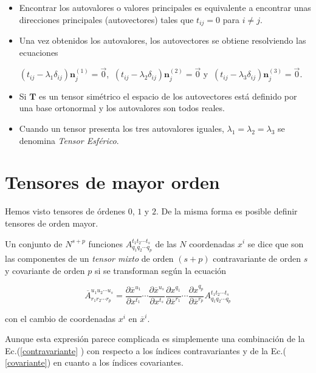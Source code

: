 \begin{remark}
\begin{itemize}
\item
Encontrar los autovalores o valores principales es equivalente a encontrar unas direcciones principales (autovectores) tales que $t_{ij}=0$ para $i \neq j$.


\item
 Una vez obtenidos los autovalores, los autovectores se obtiene  resolviendo las ecuaciones 

 $(t_{ij}- \lambda_1 \delta_{ij}) \textbf{n}_j^{(1)}=\Vec{0}$, $~(t_{ij}- \lambda_2 \delta_{ij}) \textbf{n}_j^{(2)}=\Vec{0}$ y $~(t_{ij}- \lambda_3 \delta_{ij}) \textbf{n}_j^{(3)}=\Vec{0}$.
\item
Si $\mathbf{T}$ es un tensor simétrico el espacio de los autovectores está definido por una base ortonormal y los autovalores son todos reales.


\item

Cuando un tensor presenta los tres autovalores iguales,  $\lambda_1= \lambda_2= \lambda_3$ se denomina \textit{Tensor Esférico}.
\end{itemize}
\end{remark}
\section{Tensores de mayor orden}

Hemos visto tensores de órdenes $0$, $1$ y $2$. De la misma forma es posible definir tensores de orden mayor. 

Un conjunto de $N^{s+p}$ funciones  $A^{t_1 t_2 \cdots  t_s}_{q_1 q_2 \cdots  q_p}$ de las $N$ coordenadas $x^i$ se dice que son las componentes de un \textit{tensor mixto} de orden $(s+p)$ contravariante de orden $s$ y covariante de orden $p$ si se transforman según la ecuación


\bigskip

\[\overline{A}^{u_1 u_2 \cdots  u_s}_{r_1 r_2 \cdots  r_p}=   \frac{\partial \overline{x}^{u_1}}{\partial  x^{t_1} }  \cdots  \frac{\partial \overline{x}^{u_s}}{\partial  x^{t_s} }  \frac{\partial  x^{q_1}}{\partial \overline {x}^{r_1}} \cdots \frac{\partial  x^{q_p}}{\partial \overline {x}^{r_p}}  A^{t_1 t_2 \cdots  t_s}_{q_1 q_2 \cdots  q_p}\]

\bigskip
\noindent
con el cambio de coordenadas $x^i $ en $\overline{ x}^i $.

  Aunque esta expresión parece complicada  es simplemente una combinación de la Ec.(\ref{contravariante} )  con respecto a los índices contravariantes y de la Ec.(  \ref{covariante}) en cuanto a los índices covariantes.

